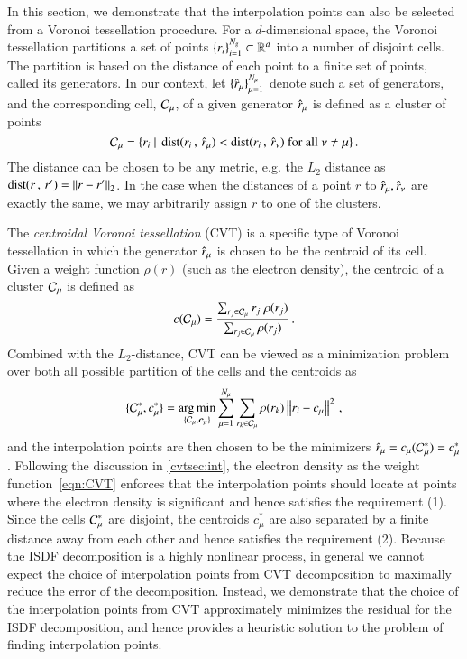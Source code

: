 In this section, we demonstrate that the interpolation points can also be
selected from a Voronoi tessellation procedure. For a $d$\hyp{}dimensional
space, the Voronoi tessellation partitions a set of points $\{r_{i}\}_{i=1}^{N_
{g}}\subset\mathbb{R}^{d}$ into a number of disjoint cells. The partition is based on
the distance of each point to a finite set of points, called its generators. In
our context, let $\{\hat{r}_\mu\}_{\mu=1}^{N_{\mu}}$ denote such a set of
generators, and the corresponding cell, $\mathcal{C}_\mu$, of a given generator
$\hat{r}_\mu$ is defined as a cluster of points
\begin{equation}\label{eqn:vcell}
  \mathcal{C}_\mu = \{r_{i} ~\vert~\operatorname{dist}(r_{i}\,,\, \hat{r}_\mu) <
  \operatorname{dist}(r_{i}\, ,\, \hat{r}_\nu) \textrm{ for all } \nu \neq \mu\}\,.
\end{equation}
The distance can be chosen to be any metric, e.g. the $L_2$ distance as $\operatorname{dist}
(r\,,\,r')=\left\lVert r-r'\right\rVert_2$. In the case when the distances of a point $r$ to
$\hat{r}_\mu, \hat{r}_\nu$ are exactly the same, we may arbitrarily assign $r$ to
one of the clusters.

The \emph{centroidal Voronoi tessellation} (CVT) is a specific type of Voronoi
tessellation in which the generator $\hat{r}_\mu$ is chosen to be the centroid of
its cell. Given a weight function $\rho(r)$ (such as the electron density), the
centroid of a cluster $\mathcal{C}_\mu$ is defined as
\begin{equation}\label{eqn:centcomp}
  c(\mathcal{C}_\mu) = \frac{\sum_{r_{j}\in \mathcal{C}_\mu} r_j\;\rho(r_j)}{\sum_{r_j\in
  \mathcal{C}_\mu}\rho(r_j)}\,.
\end{equation}
Combined with the $L_2$\hyp{}distance, CVT can be viewed as a minimization
problem over both all possible partition of the cells and the centroids as 
\cite{MacQueen1967}
\begin{equation}\label{eqn:CVT}
  \{\mathcal{C}_\mu^\ast,c_{\mu}^{*}\} = \operatorname*{arg\,min}_{\{\mathcal{C}_\mu, \bm{c}_{\mu}\}} \sum_
  {\mu=1}^{N_{\mu}} \sum_{r_k\in \mathcal{C}_\mu}\rho(r_k)\left\lVert r_i-c_{\mu}\right\rVert^2\,,
\end{equation}
and the interpolation points are then chosen to be the minimizers
$\hat{r}_\mu=c_{\mu}(\mathcal{C}_\mu^\ast)=c_{\mu}^{\ast}$. Following the discussion in
\cref{cvtsec:int}, the electron density as the weight function~\eqref{eqn:CVT}
enforces that the interpolation points should locate at points where the
electron density is significant and hence satisfies the requirement (1). Since
the cells $\mathcal{C}_\mu^\ast$ are disjoint, the centroids $c_{\mu}^\ast$ are also
separated by a finite distance away from each other and hence satisfies the
requirement (2). Because the ISDF decomposition is a highly nonlinear process,
in general we cannot expect the choice of interpolation points from CVT
decomposition to maximally reduce the error of the decomposition. Instead, we
demonstrate that the choice of the interpolation points from CVT approximately
minimizes the residual for the ISDF decomposition, and hence provides a
heuristic solution to the problem of finding interpolation points.

